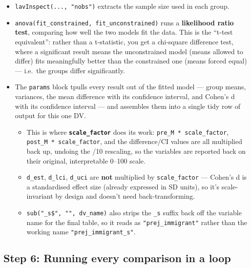 \documentclass[
  letterpaper,
  DIV=11,
  numbers=noendperiod]{scrreprt}
\providecommand{\tightlist}{%
  \setlength{\itemsep}{0pt}\setlength{\parskip}{0pt}}\usepackage{longtable,booktabs,array}
\begin{document}
\begin{itemize}
\tightlist
\item
  \texttt{lavInspect(...,\ "nobs")} extracts the sample size used in
  each group.
\end{itemize}

\begin{itemize}
\item
  \texttt{anova(fit\_constrained,\ fit\_unconstrained)} runs a
  \textbf{likelihood ratio test}, comparing how well the two models fit
  the data. This is the ``t-test equivalent'': rather than a
  t-statistic, you get a chi-square difference test, where a significant
  result means the unconstrained model (means allowed to differ) fits
  meaningfully better than the constrained one (means forced equal) ---
  i.e.~the groups differ significantly.
\item
  The \texttt{params} block tpulls every result out of the fitted model
  --- group means, variances, the mean difference with its confidence
  interval, and Cohen's d with its confidence interval --- and assembles
  them into a single tidy row of output for this one DV.

  \begin{itemize}
  \item
    This is where \textbf{\texttt{scale\_factor}} does its work:
    \texttt{pre\_M\ *\ scale\_factor},
    \texttt{post\_M\ *\ scale\_factor}, and the difference/CI values are
    all multiplied back up, undoing the /10 rescaling, so the variables
    are reported back on their original, interpretable 0--100 scale.
  \item
    \texttt{d\_est}, \texttt{d\_lci}, \texttt{d\_uci} are \textbf{not}
    multiplied by \texttt{scale\_factor} --- Cohen's d is a standardised
    effect size (already expressed in SD units), so it's scale-invariant
    by design and doesn't need back-transforming.
  \item
    \texttt{sub("\_s\$",\ "",\ dv\_name)} also strips the \texttt{\_s}
    suffix back off the variable name for the final table, so it reads
    as \texttt{"prej\_immigrant"} rather than the working name
    \texttt{"prej\_immigrant\_s"}.
  \end{itemize}
\end{itemize}

\subsection{Step 6: Running every comparison in a
loop}\label{step-6-running-every-comparison-in-a-loop}
\end{document}
